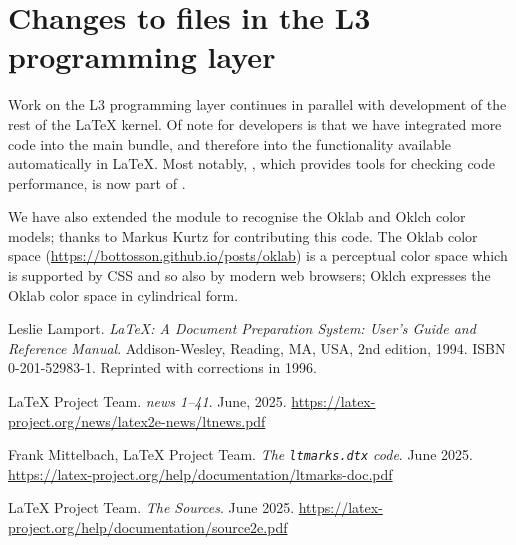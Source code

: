 \documentclass{ltnews}
\begin{document}
\section{Changes to files in the L3 programming layer}


Work on the L3 programming layer continues 
in parallel with development of the
rest of the
\LaTeX{} kernel. 
Of note for developers is that we have integrated more code
into the main  bundle, and therefore into the functionality
available automatically in \LaTeX{}. Most notably, , which
provides tools for checking code performance, is now part of .

We have also extended the  module to recognise the Oklab
and Oklch color models; thanks to Markus Kurtz for contributing this
code. The Oklab color space
(\url{https://bottosson.github.io/posts/oklab}) is a perceptual color
space which is supported by CSS and so also by modern web browsers;
Oklch expresses the Oklab color space in cylindrical form.


\begin{thebibliography}{9}\frenchspacing


Leslie Lamport.
\newblock \emph{{\LaTeX}: {A} Document Preparation System: User's Guide and Reference
  Manual}.
\newblock \mbox{Addison}-Wesley, Reading, MA, USA, 2nd edition, 1994.
\newblock ISBN 0-201-52983-1.
\newblock Reprinted with corrections in 1996.

 \LaTeX{} Project Team.
  \emph{\LaTeXe{} news 1--41}. June, 2025.
  \url{https://latex-project.org/news/latex2e-news/ltnews.pdf}

 Frank Mittelbach, \LaTeX{} Project Team.
  \emph{The \texttt{ltmarks.dtx} code}. June 2025.
  \url{https://latex-project.org/help/documentation/ltmarks-doc.pdf}

 \LaTeX{} Project Team.
  \emph{The \LaTeXe{} Sources}. June 2025.
  \url{https://latex-project.org/help/documentation/source2e.pdf}

\end{thebibliography}
\end{document}
